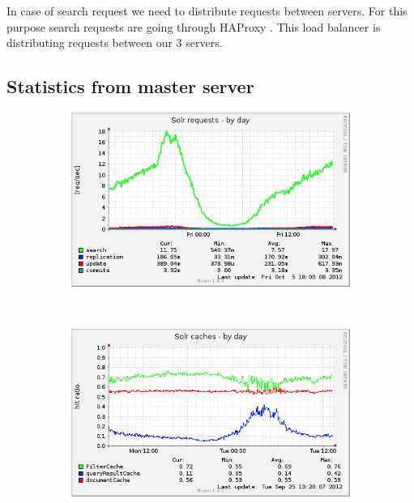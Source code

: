 \documentclass[10pt,a4paper]{article}
\begin{document}
In case of search request we need to distribute requests between servers. For this purpose search requests are going through HAProxy \cite{HAPROXY}. This load balancer is distributing requests between our 3 servers.

\subsection{Statistics from master server}

\begin{figure}
        \centering
        \begin{subfigure}[b]{0.49\textwidth}
                \centering
                \includegraphics[width=\textwidth]{solr_users_reqs-day}
                \label{fig:solr_users_reqs-day}
        \end{subfigure}%
        ~ %
        \begin{subfigure}[b]{0.49\textwidth}
                \centering
                \includegraphics[width=\textwidth]{solr_users_cache-day}
                \label{fig:solr_users_cache-day}
        \end{subfigure}
        

\end{figure}
\end{document}
